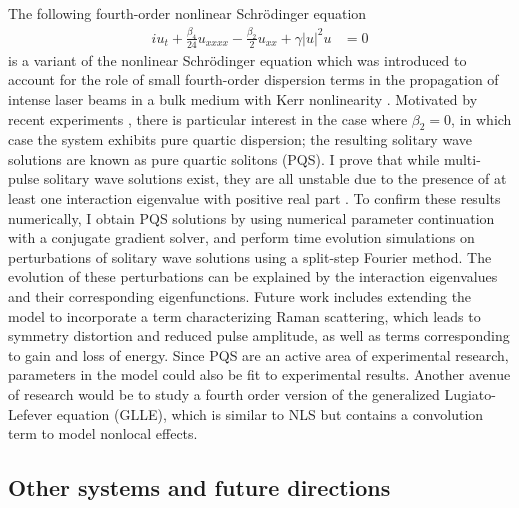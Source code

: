 \documentclass[12pt,reqno,oneside,hidelinks]{article}
\begin{document}
The following fourth-order nonlinear Schr{\"o}dinger equation
\begin{align*}
    i u_t + \frac{\beta_4}{24}u_{xxxx} - \frac{\beta_2}{2}u_{xx} + \gamma |u|^2 u &= 0 
\end{align*}
is a variant of the nonlinear Schr{\"o}dinger equation which was introduced to account for the role of small fourth-order dispersion terms in the propagation of intense laser beams in a bulk medium with Kerr nonlinearity \cite{Karpman2000,Tam2020}. Motivated by recent experiments \cite{Tam2019}, there is particular interest in the case where $\beta_2 = 0$, in which case the system exhibits pure quartic dispersion; the resulting solitary wave solutions are known as pure quartic solitons (PQS). I prove that while multi-pulse solitary wave solutions exist, they are all unstable due to the presence of at least one interaction eigenvalue with positive real part \cite[Theorems 1 and 2]{Parker2020NLS4}. To confirm these results numerically, I obtain PQS solutions by using numerical parameter continuation with a conjugate gradient solver, and perform time evolution simulations on perturbations of solitary wave solutions using a split-step Fourier method. The evolution of these perturbations can be explained by the interaction eigenvalues and their corresponding eigenfunctions. Future work includes extending the model to incorporate a term characterizing Raman scattering, which leads to symmetry distortion and reduced pulse amplitude, as well as terms corresponding to gain and loss of energy. Since PQS are an active area of experimental research, parameters in the model could also be fit to experimental results. Another avenue of research would be to study a fourth order version of the generalized Lugiato-Lefever equation (GLLE), which is similar to NLS but contains a convolution term to model nonlocal effects.

\subsection*{Other systems and future directions}
\end{document}
